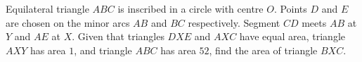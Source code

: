 Equilateral triangle $ABC$ is inscribed in a circle with centre $O$. Points $D$ and $E$ are chosen on the minor arcs $AB$ and $BC$ respectively. Segment $CD$ meets $AB$ at $Y$ and $AE$ at $X$. Given that triangles $DXE$ and $AXC$ have equal area, triangle $AXY$ has area $1$, and triangle $ABC$ has area $52$, find the area of triangle $BXC$.
